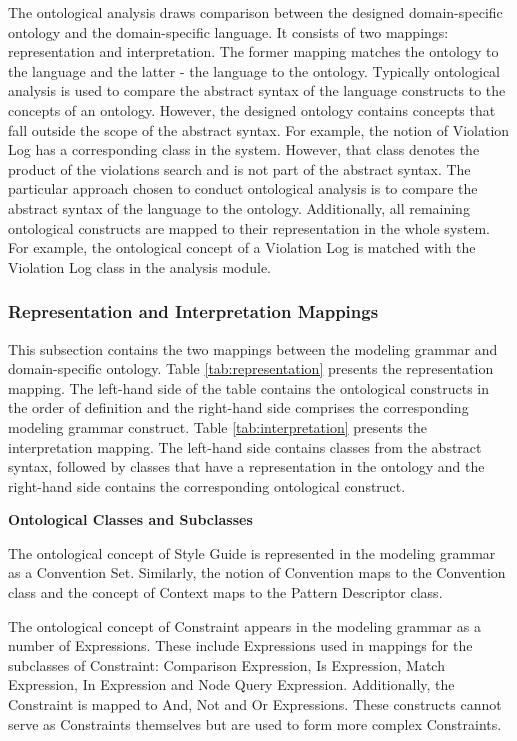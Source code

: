 \documentclass[parskip=full]{uvamscse}
\begin{document}
The ontological analysis draws comparison between the designed domain-specific ontology and the
domain-specific language. It consists of two mappings: representation and interpretation. The former
mapping matches the ontology to the language and the latter - the language to the ontology.
Typically ontological analysis is used to compare the abstract syntax of the language constructs to
the concepts of an ontology. However, the designed ontology contains concepts that fall outside the
scope of the abstract syntax. For example, the notion of Violation Log has a corresponding class in
the system. However, that class denotes the product of the violations search and is not part of the
abstract syntax. The particular approach chosen to conduct ontological analysis is to compare the
abstract syntax of the language to the ontology. Additionally, all remaining ontological constructs
are mapped to their representation in the whole system. For example, the ontological concept of a
Violation Log is matched with the Violation Log class in the analysis module.

\subsubsection{Representation and Interpretation Mappings} 

This subsection contains the two mappings between the modeling grammar and domain-specific ontology.
Table \ref{tab:representation} presents the representation mapping. The left-hand side of the table
contains the ontological constructs in the order of definition and the right-hand side comprises the
corresponding modeling grammar construct. Table \ref{tab:interpretation} presents the interpretation
mapping. The left-hand side contains classes from the abstract syntax, followed by classes that have
a representation in the ontology and the right-hand side contains the corresponding ontological
construct.





\textbf{Ontological Classes and Subclasses}

The ontological concept of Style Guide is represented in the modeling grammar as a Convention Set.
Similarly, the notion of Convention maps to the Convention class and the concept of Context maps to
the Pattern Descriptor class.

The ontological concept of Constraint appears in the modeling grammar as a number of Expressions.
These include Expressions used in mappings for the subclasses of Constraint: Comparison Expression,
Is Expression, Match Expression, In Expression and Node Query Expression. Additionally, the
Constraint is mapped to And, Not and Or Expressions. These constructs cannot serve as Constraints
themselves but are used to form more complex Constraints.
\end{document}
